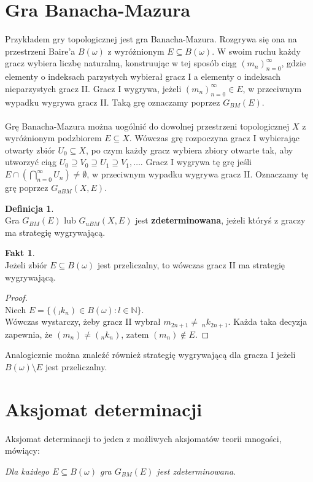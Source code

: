 \documentclass[12pt, a4paper, 2.5cm]{article}
\theoremstyle{definition}
\newtheorem{definition}{Definicja}
\newtheorem{fact}{Fakt}
\begin{document}
	\section{Gra Banacha-Mazura}
	Przykładem gry topologicznej jest gra Banacha-Mazura. Rozgrywa się ona na przestrzeni Baire'a $B(\omega)$ z wyróżnionym $E\subseteq B(\omega)$. W swoim ruchu każdy gracz wybiera liczbę naturalną, konstruując w tej sposób ciąg $(m_n)^\infty_{n=0}$, gdzie elementy o indeksach parzystych wybierał gracz I a elementy o indeksach nieparzystych gracz II. Gracz I wygrywa, jeżeli $(m_n)^\infty_{n=0}\in E$, w przeciwnym wypadku wygrywa gracz II. Taką grę oznaczamy poprzez $G_{BM}(E)$.\\\\
	Grę Banacha-Mazura można uogólnić do dowolnej przestrzeni topologicznej $X$ z wyróżnionym podzbiorem $E\subseteq X$. Wówczas grę rozpoczyna gracz I wybierając otwarty zbiór $U_0\subseteq X$, po czym każdy gracz wybiera zbiory otwarte tak, aby utworzyć ciąg $U_0\supseteq V_0\supseteq U_1\supseteq V_1,\dots$. Gracz I wygrywa tę grę jeśli $E\cap \left(\bigcap^\infty_{n=0} U_n\right)\neq \emptyset$, w przeciwnym wypadku wygrywa gracz II. Oznaczamy tę grę poprzez $G_{uBM}(X, E)$.
	\begin{definition}
		~\\
		Gra $G_{BM}(E)$ lub $G_{uBM}(X, E)$ jest \textbf{zdeterminowana}, jeżeli któryś z graczy ma strategię wygrywającą.
	\end{definition}
	\begin{fact}
		~\\
		Jeżeli zbiór $E\subseteq B(\omega)$ jest przeliczalny, to wówczas gracz II ma strategię wygrywającą.
	\end{fact}
	\begin{proof}
		~\\
		Niech $E=\{(_lk_n)\in B(\omega):l\in\mathbb{N}\}$.\\
		Wówczas wystarczy, żeby gracz II wybrał $m_{2n+1}\neq\:_nk_{2n+1}$. Każda taka decyzja zapewnia, że $(m_{n})\neq ( _nk_n)$, zatem $(m_n)\not\in E$.
	\end{proof}
	\noindent Analogicznie można znaleźć również strategię wygrywającą dla gracza I jeżeli $B(\omega)\setminus E$ jest przeliczalny.
	\section{Aksjomat determinacji}
	Aksjomat determinacji to jeden z możliwych aksjomatów teorii mnogości, mówiący: 
	\begin{center}
		\textit{Dla każdego $E\subseteq B(\omega)$ gra $G_{BM}(E)$ jest zdeterminowana}.
	\end{center}
\end{document}

